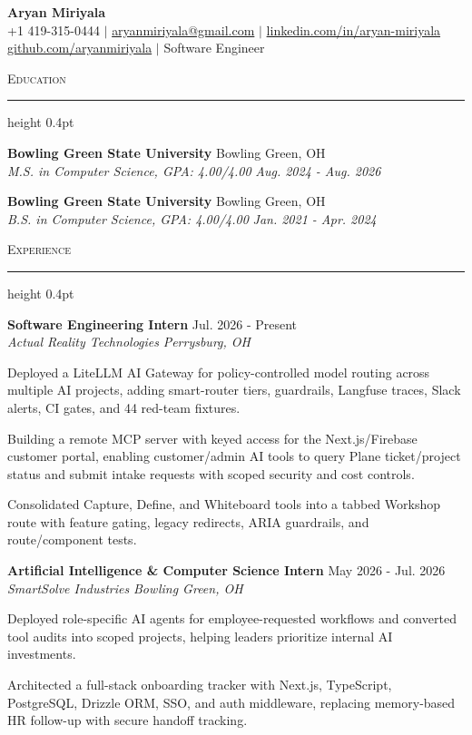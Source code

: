 \documentclass[letterpaper,11pt]{article}
\newcommand{\resumesection}[1]{%
  \par\vspace{2pt}%
  {\large\scshape #1}\par\vspace{2pt}%
  \hrule height 0.4pt\vspace{2pt}%
}
\newcommand{\resumeSubheading}[4]{
  \textbf{#1} \hfill #2\\
  \textit{#3} \hfill \textit{#4}
}
\begin{document}
\begin{center}
  {\LARGE \textbf{Aryan Miriyala}}\\[2pt]
  \small
  +1 419-315-0444 $|$ \href{mailto:aryanmiriyala@gmail.com}{aryanmiriyala@gmail.com} $|$ \href{https://www.linkedin.com/in/aryan-miriyala-7788a21b6/}{linkedin.com/in/aryan-miriyala}\\
  \href{https://github.com/aryanmiriyala}{github.com/aryanmiriyala} $|$ Software Engineer
\end{center}\vspace{-6pt}

\resumesection{Education}
\resumeSubheading
{Bowling Green State University}{Bowling Green, OH}
{M.S. in Computer Science, GPA: 4.00/4.00}{Aug. 2024 - Aug. 2026}

\resumeSubheading
{Bowling Green State University}{Bowling Green, OH}
{B.S. in Computer Science, GPA: 4.00/4.00}{Jan. 2021 - Apr. 2024}

\resumesection{Experience}
\resumeSubheading
{Software Engineering Intern}{Jul. 2026 - Present}
{Actual Reality Technologies}{Perrysburg, OH}
\begin{tightitemize}
  \item Deployed a LiteLLM AI Gateway for policy-controlled model routing across multiple AI projects, adding smart-router tiers, guardrails, Langfuse traces, Slack alerts, CI gates, and 44 red-team fixtures.
  \item Building a remote MCP server with keyed access for the Next.js/Firebase customer portal, enabling customer/admin AI tools to query Plane ticket/project status and submit intake requests with scoped security and cost controls.
  \item Consolidated Capture, Define, and Whiteboard tools into a tabbed Workshop route with feature gating, legacy redirects, ARIA guardrails, and route/component tests.
\end{tightitemize}

\resumeSubheading
{Artificial Intelligence \& Computer Science Intern}{May 2026 - Jul. 2026}
{SmartSolve Industries}{Bowling Green, OH}
\begin{tightitemize}
  \item Deployed role-specific AI agents for employee-requested workflows and converted tool audits into scoped projects, helping leaders prioritize internal AI investments.
  \item Architected a full-stack onboarding tracker with Next.js, TypeScript, PostgreSQL, Drizzle ORM, SSO, and auth middleware, replacing memory-based HR follow-up with secure handoff tracking.
\end{tightitemize}
\end{document}
